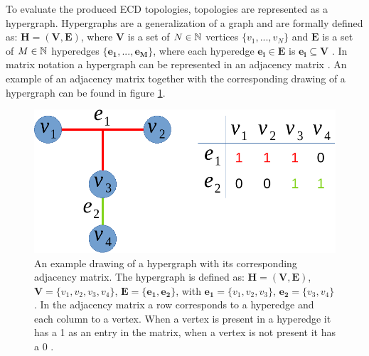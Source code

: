 To evaluate the produced \ac{ECD} topologies, topologies are represented as a hypergraph.
Hypergraphs are a generalization of a graph and are formally defined as:
$\mathbf{H} = (\mathbf{V}, \mathbf{E})$, where $\mathbf{V}$ is a set of $N \in \mathbb{N}$ vertices $\{v_1,...,v_N\}$ and $\mathbf{E}$ is a set of $M \in \mathbb{N}$ hyperedges $\{\mathbf{e_1},...,\mathbf{e_M}\}$, where each hyperedge $\mathbf{e_i} \in \mathbf{E}$ is $\mathbf{e_i} \subseteq \mathbf{V}$ \cite{hypergraph_def}.
In matrix notation a hypergraph can be represented in an adjacency matrix \cite{hypergraph_adjacency}.
An example of an adjacency matrix together with the corresponding drawing of a hypergraph can be found in figure \ref{fig:hypergraph_adjacency}.

\begin{figure}
\begin{center}
    \includegraphics[width=13cm]{imgs/hypergraph_adjacency_cropped.pdf}
    \caption{An example drawing of a hypergraph with its corresponding adjacency matrix. The hypergraph is defined as: $\mathbf{H} = (\mathbf{V}, \mathbf{E})$, $\mathbf{V} = \{v_1, v_2, v_3, v_4\}$, $\mathbf{E} = \{\mathbf{e_1}, \mathbf{e_2}\}$, with $\mathbf{e_1} = \{v_1, v_2, v_3\}$, $\mathbf{e_2} = \{v_3, v_4\}$. In the adjacency matrix a row corresponds to a hyperedge and each column to a vertex. When a vertex is present in a hyperedge it has a 1 as an entry in the matrix, when a vertex is not present it has a 0 \cite{hypergraph_adjacency_my}.}
    \label{fig:hypergraph_adjacency}
\end{center}
\end{figure}
